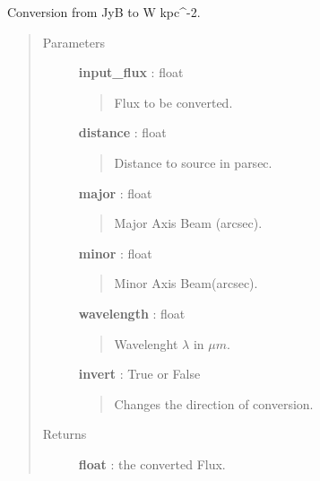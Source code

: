 \documentclass[a4paper,10pt,english]{sphinxmanual}
\begin{document}
\begin{fulllineitems}
\label{functions:astrolyze.functions.units.JyBToWKpc2}
Conversion from JyB to W kpc\textasciicircum{}-2.
\begin{quote}\begin{description}
\item[{Parameters }] \leavevmode
\textbf{input\_flux} :  float
\begin{quote}

Flux to be converted.
\end{quote}

\textbf{distance} : float
\begin{quote}

Distance to source in parsec.
\end{quote}

\textbf{major} : float
\begin{quote}

Major Axis Beam (arcsec).
\end{quote}

\textbf{minor} : float
\begin{quote}

Minor Axis Beam(arcsec).
\end{quote}

\textbf{wavelength} : float
\begin{quote}

Wavelenght $\lambda$ in $\mu m$.
\end{quote}

\textbf{invert} : True or False
\begin{quote}

Changes the direction of conversion.
\end{quote}

\item[{Returns }] \leavevmode
\textbf{float} : the converted Flux.

\end{description}\end{quote}

\end{fulllineitems}

\end{document}
